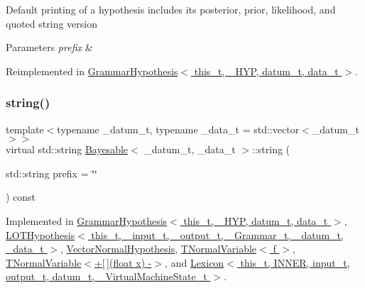 Default printing of a hypothesis includes its posterior, prior, likelihood, and quoted string version 
\begin{DoxyParams}{Parameters}
{\em prefix} & \\
\hline
\end{DoxyParams}


Reimplemented in \hyperlink{class_grammar_hypothesis_a7b791d9da5ae86c52a42a2383c1c6bc0}{Grammar\+Hypothesis$<$ this\+\_\+t, \+\_\+\+H\+Y\+P, datum\+\_\+t, data\+\_\+t $>$}.

\mbox{\label{class_bayesable_ab6944b4bfe5620c96048287a51d019c1}} 
\subsubsection{\texorpdfstring{string()}{string()}}
{\footnotesize\ttfamily template$<$typename \+\_\+datum\+\_\+t, typename \+\_\+data\+\_\+t = std\+::vector$<$\+\_\+datum\+\_\+t$>$$>$ \\
virtual std\+::string \hyperlink{class_bayesable}{Bayesable}$<$ \+\_\+datum\+\_\+t, \+\_\+data\+\_\+t $>$\+::string (\begin{DoxyParamCaption}\item[{std\+::string}]{prefix = {\ttfamily \char`\"{}\char`\"{}} }\end{DoxyParamCaption}) const\hspace{0.3cm}{\ttfamily [pure virtual]}}



Implemented in \hyperlink{class_grammar_hypothesis_a4f978eb7e5b7e5dc86f8a434297f8c8e}{Grammar\+Hypothesis$<$ this\+\_\+t, \+\_\+\+H\+Y\+P, datum\+\_\+t, data\+\_\+t $>$}, \hyperlink{class_l_o_t_hypothesis_a0d4f526264b781130674863164707927}{L\+O\+T\+Hypothesis$<$ this\+\_\+t, \+\_\+input\+\_\+t, \+\_\+output\+\_\+t, \+\_\+\+Grammar\+\_\+t, \+\_\+datum\+\_\+t, \+\_\+data\+\_\+t $>$}, \hyperlink{class_vector_normal_hypothesis_ad233ed5c8de7cbc7e44120dbe669cc5a}{Vector\+Normal\+Hypothesis}, \hyperlink{class_t_normal_variable_aa1d91679b1143624a018b073646a1c46}{T\+Normal\+Variable$<$ f $>$}, \hyperlink{class_t_normal_variable_aa1d91679b1143624a018b073646a1c46}{T\+Normal\+Variable$<$+\mbox{[}$\,$\mbox{]}(float x) -\/$>$}, and \hyperlink{class_lexicon_a94d839ba9055b7a8e859628828939ffb}{Lexicon$<$ this\+\_\+t, I\+N\+N\+E\+R, input\+\_\+t, output\+\_\+t, datum\+\_\+t, \+\_\+\+Virtual\+Machine\+State\+\_\+t $>$}.



